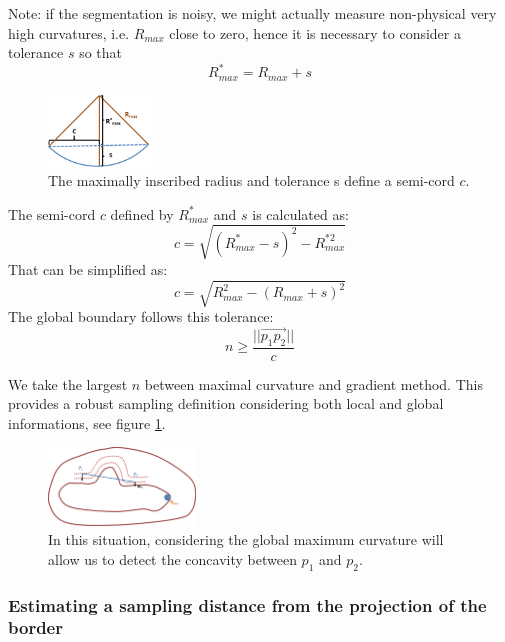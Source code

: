 \documentclass[11pt,a4paper]{article}
\begin{document}
Note: if the segmentation is noisy, we might actually measure non-physical very high curvatures, i.e. $R_{max}$ close to zero, hence it is necessary to consider a tolerance $s$ so that 
\begin{equation}
R_{max}^* = R_{max} + s
\end{equation}

\begin{figure}[h!]
			\centering
			\includegraphics[width=0.25\textwidth]{Drawings/CurvatureTolerance.png}
			\caption{The maximally inscribed radius and tolerance s define a semi-cord $c$.}
\end{figure}

The semi-cord $c$ defined by $R_{max}^*$ and $s$ is calculated as:
\begin{equation}
c = \sqrt{(R_{max}^*-s)^2 - R_{max}^{*2}}
\end{equation} 
That can be simplified as:
\begin{equation}
c = \sqrt{R_{max}^2 - (R_{max} + s)^2}
\end{equation}
The global boundary follows this tolerance:
\begin{equation}
n \geq \frac{||\overset{\rightarrow}{p_1p_2}||}{c}
\end{equation}

We take the largest $n$ between maximal curvature and gradient method. This provides a robust sampling definition considering both local and global informations, see figure \ref{test sampling}.
\begin{figure}[h!]
			\label{test sampling}
			\centering
			\includegraphics[width=0.35\textwidth]{Drawings/CurvatureTestExample2.png}
			\caption{In this situation, considering the global maximum curvature will allow us to detect the concavity between $p_1$ and $p_2$.}
\end{figure}

\subsubsection{Estimating a sampling distance from the projection of the border}
\end{document}
